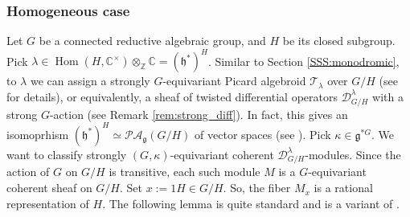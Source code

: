 \documentclass[12pt]{amsart}
\newcommand{\C}{\mathbb{C}}
\newcommand{\g}{\mathfrak{g}}
\newcommand{\Z}{\mathbb{Z}}
\newcommand{\hf}{\mathfrak{h}}
\newcommand{\TT}{\mathscr{T}}
\newcommand{\pic}{\mathscr{PA}}
\theoremstyle{definition}
\numberwithin{equation}{section}
\begin{document}
\subsubsection{Homogeneous case}\label{SSS_homog_case}
Let $G$ be a connected reductive algebraic group, and $H$ be its closed subgroup. Pick $\lambda\in
\operatorname{Hom}(H,\C^\times)\otimes_{\Z}\C = (\hf^*)^H$. Similar to Section \ref{SSS:monodromic}, to $\lambda$ we can assign a strongly $G$-equivariant Picard algebroid $\TT_\lambda$ over $G/H$ (see \cite[Section 2.4.2]{Yu} for details), or equivalently, a sheaf of twisted
differential operators $\mathscr{D}^\lambda_{G/H}$ with a strong $G$-action (see Remark \ref{rem:strong_diff}). In fact, this gives an isomoprhism $(\hf^*)^H \simeq \pic_\g(G/H)$ of vector spaces (see \cite[Proposition 2.4]{Yu}). Pick $\kappa\in \g^{*G}$. We want to classify strongly
$(G,\kappa)$-equivariant coherent $\mathscr{D}^\lambda_{G/H}$-modules. Since the action of $G$
on $G/H$ is transitive, each such module $M$ is a $G$-equivariant coherent sheaf on
$G/H$. Set $x:=1H\in G/H$. So, the fiber $M_x$ is a rational representation of $H$.
The following lemma is quite standard and is a variant of \cite[Lemma 2.7]{Yu}.
\end{document}
